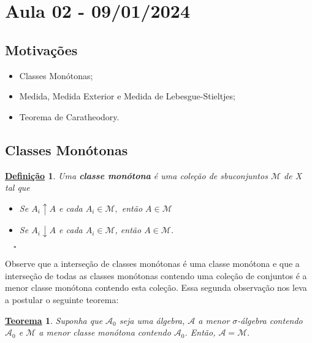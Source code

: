 \documentclass{article}
\newtheorem*{def*}{\underline{Defini\c c\~ao}}
\newtheorem*{theorem*}{\underline{Teorema}}
\begin{document}
\newpage

\section{Aula 02 - 09/01/2024}
\subsection{Motivações}
\begin{itemize}
	\item Classes Monótonas;
	\item Medida, Medida Exterior e Medida de Lebesgue-Stieltjes;
	\item Teorema de Caratheodory.
\end{itemize}
\subsection{Classes Monótonas}
\begin{def*}
	Uma \textbf{classe monótona} é uma coleção de sbuconjuntos \(\mathcal{M}\) de X tal que

	\begin{itemize}
		\item[1)] Se \(A_{i}\uparrow A\) e cada \(A_{i}\in \mathcal{M},\) então \(A\in \mathcal{M}\)
		\item[2)] Se \(A_{i}\downarrow A\) e cada \(A_{i}\in \mathcal{M}\), então \(A\in \mathcal{M}\).
	\end{itemize}\(\quad \square\)
\end{def*}
Observe que a interseção de classes monótonas é uma classe monótona e que a interseção de todas as classes monótonas contendo uma coleção de conjuntos é a menor
classe monótona contendo esta coleção. Essa segunda observação nos leva a postular o seguinte teorema:
\begin{theorem*}
	Suponha que \(\mathcal{A}_{0}\) seja uma álgebra, \(\mathcal{A}\) a menor \(\sigma \)-álgebra contendo \(\mathcal{A}_{0}\) e \(\mathcal{M} \) a menor classe monótona contendo \(\mathcal{A}_{0}\). Então, \(\mathcal{A} = \mathcal{M}.\)
\end{theorem*}
\end{document}
